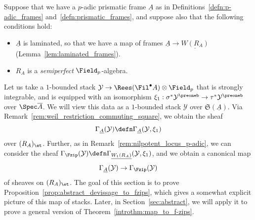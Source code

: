 \documentclass[10pt]{amsart}
\begin{document}
Suppose that we have a $p$-adic prismatic frame $\underline{A}$ as in Definitions~\ref{defn:p-adic_frames} and~\ref{defn:prismatic_frames}, and suppose also that the following conditions hold:
\begin{itemize}
   \item $\underline{A}$ is laminated, so that we have a map of frames $\underline{A}\to \underline{W(R_A)}$ (Lemma~\ref{lem:laminated_frames}).
   \item $R_A$ is a \emph{semiperfect} $\Field_p$-algebra.
\end{itemize}
 Let us take a $1$-bounded stack $\mathcal{Y}\to \Rees(\Fil^\bullet A)\otimes\Field_p$ that is strongly integrable, and is equipped with an isomorphism $\xi_1:\sigma^* \mathcal{Y}^\preoneb\to \tau^* \mathcal{Y}^\preoneb$ over $\Spec \overline{A}$. We will view this data as a $1$-bounded stack $\mathcal{Y}$ over $\mathfrak{S}(\underline{A})$. Via Remark~\ref{rem:weil_restriction_commuting_square}, we obtain the sheaf 
\[
\Gamma_{\underline{A}}(\mathcal{Y}) \defn \Gamma_{\underline{A}}(\mathcal{Y},\xi_1)
\]
over $(R_A)_{\et}$. Further, as in Remark~\ref{rem:nilpotent_locus_p-adic}, we can consider the sheaf $\Gamma_{\Fzip}(\mathcal{Y})\defn \Gamma_{\underline{W_1(R_A)}}(\mathcal{Y},\xi_1)$, and we obtain a canonical map
\[
\Gamma_{\underline{A}}(\mathcal{Y})\to \Gamma_{\Fzip}(\mathcal{Y})
\] 
of sheaves on $(R_A)_{\et}$. The goal of this section is to prove Proposition~\ref{prop:abstract_devissage_to_fzips}, which gives a somewhat explicit picture of this map of stacks. Later, in Section~\ref{sec:abstract}, we will apply it to prove a general version of Theorem~\ref{introthm:map_to_f-zips}. 
\end{document}
